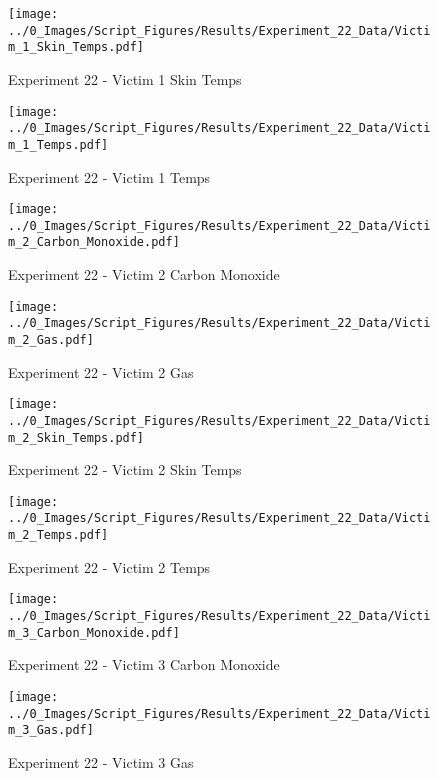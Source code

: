 	\begin{figure}[H]
		\centering
		\texttt{[image: ../0\_Images/Script\_Figures/Results/Experiment\_22\_Data/Victim\_1\_Skin\_Temps.pdf]}
		\caption[]{Experiment 22 - Victim 1 Skin Temps}
	\end{figure}
 
	\clearpage

	\begin{figure}[H]
		\centering
		\texttt{[image: ../0\_Images/Script\_Figures/Results/Experiment\_22\_Data/Victim\_1\_Temps.pdf]}
		\caption[]{Experiment 22 - Victim 1 Temps}
	\end{figure}
 

	\begin{figure}[H]
		\centering
		\texttt{[image: ../0\_Images/Script\_Figures/Results/Experiment\_22\_Data/Victim\_2\_Carbon\_Monoxide.pdf]}
		\caption[]{Experiment 22 - Victim 2 Carbon Monoxide}
	\end{figure}
 
	\clearpage

	\begin{figure}[H]
		\centering
		\texttt{[image: ../0\_Images/Script\_Figures/Results/Experiment\_22\_Data/Victim\_2\_Gas.pdf]}
		\caption[]{Experiment 22 - Victim 2 Gas}
	\end{figure}
 

	\begin{figure}[H]
		\centering
		\texttt{[image: ../0\_Images/Script\_Figures/Results/Experiment\_22\_Data/Victim\_2\_Skin\_Temps.pdf]}
		\caption[]{Experiment 22 - Victim 2 Skin Temps}
	\end{figure}
 
	\clearpage

	\begin{figure}[H]
		\centering
		\texttt{[image: ../0\_Images/Script\_Figures/Results/Experiment\_22\_Data/Victim\_2\_Temps.pdf]}
		\caption[]{Experiment 22 - Victim 2 Temps}
	\end{figure}
 

	\begin{figure}[H]
		\centering
		\texttt{[image: ../0\_Images/Script\_Figures/Results/Experiment\_22\_Data/Victim\_3\_Carbon\_Monoxide.pdf]}
		\caption[]{Experiment 22 - Victim 3 Carbon Monoxide}
	\end{figure}
 
	\clearpage

	\begin{figure}[H]
		\centering
		\texttt{[image: ../0\_Images/Script\_Figures/Results/Experiment\_22\_Data/Victim\_3\_Gas.pdf]}
		\caption[]{Experiment 22 - Victim 3 Gas}
	\end{figure}
 

